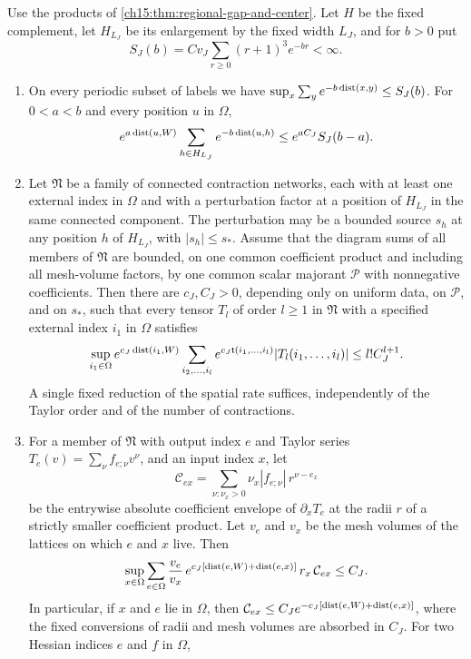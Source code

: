 \begin{lemma}\label{ch15:lem:wall-networks}
Use the products of \cref{ch15:thm:regional-gap-and-center}. Let $H$ be the fixed complement, let $H_{L_J}$ be its enlargement by the fixed width $L_J$, and for $b>0$ put
\[
 S_J(b)=C v_J\sum_{r\ge0}(r+1)^3e^{-br}<\infty .
\]
\begin{enumerate}
\item On every periodic subset of labels we have $\sup_x\sum_ye^{-b\operatorname{dist}(x,y)}\le S_J(b)$. For $0<a<b$ and every position $u$ in $\Omega$,
\[
 e^{a\operatorname{dist}(u,W)}\sum_{h\in H_{L_J}}e^{-b\operatorname{dist}(u,h)}
                                     \le e^{aC_J}S_J(b-a).
\]
\item Let $\mathfrak N$ be a family of connected contraction networks, each with at least one external index in $\Omega$ and with a perturbation factor at a position of $H_{L_J}$ in the same connected component. The perturbation may be a bounded source $s_h$ at any position $h$ of $H_{L_J}$, with $|s_h|\le s_*$. Assume that the diagram sums of all members of $\mathfrak N$ are bounded, on one common coefficient product and including all mesh-volume factors, by one common scalar majorant $\mathcal P$ with nonnegative coefficients. Then there are $c_J,C_J>0$, depending only on uniform data, on $\mathcal P$, and on $s_*$, such that every tensor $T_l$ of order $l\ge1$ in $\mathfrak N$ with a specified external index $i_1$ in $\Omega$ satisfies
\[
 \sup_{i_1\in\Omega} e^{c_J\operatorname{dist}(i_1,W)}
 \sum_{i_2,\ldots,i_l}
 e^{c_J\mathsf t(i_1,\ldots,i_l)}
                     |T_l(i_1,\ldots,i_l)|\le l!C_J^{l+1}.
\]
A single fixed reduction of the spatial rate suffices, independently of the Taylor order and of the number of contractions.
\item For a member of $\mathfrak N$ with output index $e$ and Taylor series $T_e(v)=\sum_\nu f_{e;\nu}v^\nu$, and an input index $x$, let
\[
 \mathcal C_{ex}=\sum_{\nu:\nu_x>0}\nu_x|f_{e;\nu}|\,r^{\nu-e_x}
\]
be the entrywise absolute coefficient envelope of $\partial_xT_e$ at the radii $r$ of a strictly smaller coefficient product. Let $v_e$ and $v_x$ be the mesh volumes of the lattices on which $e$ and $x$ live. Then
\begin{equation}\label{ch15:eq:input-output-envelope}
 \sup_{x\in\Omega}\sum_{e\in\Omega}\frac{v_e}{v_x}\,
 e^{c_J[\operatorname{dist}(e,W)+\operatorname{dist}(e,x)]}\,r_x\,\mathcal C_{ex}\le C_J .
\end{equation}
In particular, if $x$ and $e$ lie in $\Omega$, then $\mathcal C_{ex}\le C_Je^{-c_J[\operatorname{dist}(e,W)+\operatorname{dist}(e,x)]}$, where the fixed conversions of radii and mesh volumes are absorbed in $C_J$. For two Hessian indices $e$ and $f$ in $\Omega$,

\end{enumerate}
\end{lemma}
